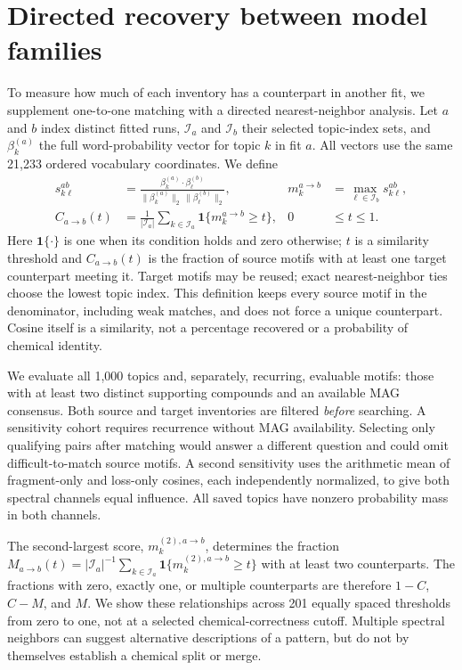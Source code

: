 \documentclass[10pt,a4paper]{article}
\begin{document}
\section{Directed recovery between model families}
\label{sec:overlap-methods}

To measure how much of each inventory has a counterpart in another fit, we
supplement one-to-one matching with a directed nearest-neighbor analysis.
Let $a$ and $b$ index distinct fitted runs, $\mathcal I_a$ and
$\mathcal I_b$ their selected topic-index sets, and
$\beta^{(a)}_k$ the full word-probability vector for topic $k$ in fit $a$.
All vectors use the same 21,233 ordered vocabulary coordinates. We define
\begin{equation}
 \begin{aligned}
 s^{ab}_{k\ell}
   &=\frac{\beta^{(a)}_k\!\cdot\!\beta^{(b)}_\ell}
           {\|\beta^{(a)}_k\|_2\,\|\beta^{(b)}_\ell\|_2},
 &m^{a\to b}_k&=\max_{\ell\in\mathcal I_b}s^{ab}_{k\ell},\\
 C_{a\to b}(t)
   &=\frac{1}{|\mathcal I_a|}\sum_{k\in\mathcal I_a}
       \mathbf{1}\{m^{a\to b}_k\geq t\},
 &0&\leq t\leq1 .
 \end{aligned}
 \label{eq:directed-recovery}
\end{equation}
Here $\mathbf{1}\{\cdot\}$ is one when its condition holds and zero otherwise;
$t$ is a similarity threshold and $C_{a\to b}(t)$ is the fraction of
source motifs with at least one target counterpart meeting it. Target motifs
may be reused; exact nearest-neighbor ties choose the lowest topic index.
This definition keeps every source motif in the denominator, including weak
matches, and does not force a unique counterpart. Cosine itself is a
similarity, not a percentage recovered or a probability of chemical identity.

We evaluate all 1,000 topics and, separately, recurring, evaluable motifs:
those with at least two distinct supporting compounds and an available MAG
consensus. Both source and target inventories are filtered \emph{before}
searching. A sensitivity cohort requires recurrence without MAG availability.
Selecting only qualifying pairs after matching would answer a different
question and could omit difficult-to-match source motifs. A second sensitivity
uses the arithmetic mean of fragment-only and loss-only cosines, each
independently normalized, to give both spectral channels equal influence.
All saved topics have nonzero probability mass in both channels.

The second-largest score, $m^{(2),a\to b}_k$, determines the fraction
$M_{a\to b}(t)=|\mathcal I_a|^{-1}\sum_{k\in\mathcal I_a}
\mathbf{1}\{m^{(2),a\to b}_k\geq t\}$ with at least two counterparts.
The fractions with zero, exactly one, or multiple counterparts are therefore
$1-C$, $C-M$, and $M$. We show these relationships across 201 equally spaced
thresholds from zero to one, not at a selected chemical-correctness cutoff.
Multiple spectral neighbors can suggest alternative descriptions of a
pattern, but do not by themselves establish a chemical split or merge.
\end{document}
